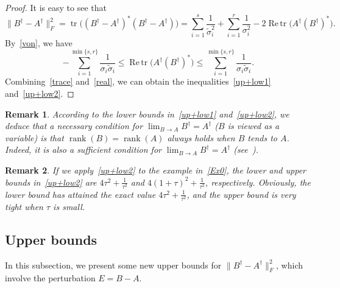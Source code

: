 \documentclass[11pt]{article}
\newtheorem{remark}{Remark}[section]
\DeclareMathOperator*{\rank}{rank}
\DeclareMathOperator*{\tr}{tr}
\DeclareMathOperator*{\Retr}{Re\,tr}
\begin{document}
\begin{proof}
It is easy to see that
\begin{equation}\label{trace}
\|B^{\dagger}-A^{\dagger}\|_{F}^{2}=\tr\big((B^{\dagger}-A^{\dagger})^{\ast}(B^{\dagger}-A^{\dagger})\big)=\sum_{i=1}^{s}\frac{1}{\widetilde{\sigma}_{i}^{2}}+\sum_{i=1}^{r}\frac{1}{\sigma_{i}^{2}}-2\Retr\big(A^{\dagger}(B^{\dagger})^{\ast}\big).
\end{equation}
By~\eqref{von}, we have
\begin{equation}\label{real}
-\sum_{i=1}^{\min\{s,r\}}\frac{1}{\sigma_{i}\widetilde{\sigma}_{i}}\leq\Retr\big(A^{\dagger}(B^{\dagger})^{\ast}\big)\leq\sum_{i=1}^{\min\{s,r\}}\frac{1}{\sigma_{i}\widetilde{\sigma}_{i}}.
\end{equation}
Combining~\eqref{trace} and~\eqref{real}, we can obtain the inequalities~\eqref{up+low1} and~\eqref{up+low2}.
\end{proof}

\begin{remark}\rm
According to the lower bounds in~\eqref{up+low1} and~\eqref{up+low2}, we deduce that a necessary condition for $\lim_{B\rightarrow A}B^{\dagger}=A^{\dagger}$ ($B$ is viewed as a variable) is that $\rank(B)=\rank(A)$ always holds when $B$ tends to $A$. Indeed, it is also a sufficient condition for $\lim_{B\rightarrow A}B^{\dagger}=A^{\dagger}$ (see~\cite{Stewart1969}).
\end{remark}

\begin{remark}\rm
If we apply~\eqref{up+low2} to the example in~\eqref{Ex0}, the lower and upper bounds in~\eqref{up+low2} are $4\tau^{2}+\frac{1}{\tau^{2}}$ and $4(1+\tau)^{2}+\frac{1}{\tau^{2}}$, respectively. Obviously, the lower bound has attained the exact value $4\tau^{2}+\frac{1}{\tau^{2}}$, and the upper bound is very tight when $\tau$ is small.
\end{remark}

\subsection{Upper bounds}

\label{subsec:upper}

In this subsection, we present some new upper bounds for $\|B^{\dagger}-A^{\dagger}\|_{F}^{2}$, which involve the perturbation $E=B-A$.
\end{document}
